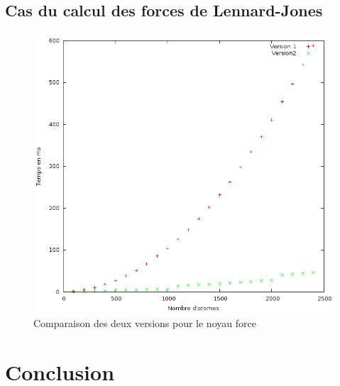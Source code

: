\documentclass{article}
\begin{document}
\subsection{Cas du calcul des forces de Lennard-Jones}

\begin{figure}[h]
	\caption{Comparaison des deux versions pour le noyau force}
	\label{lennard}
	\includegraphics[width=\textwidth]{figures/lennard.png}
\end{figure}

\section{Conclusion}
\end{document}
